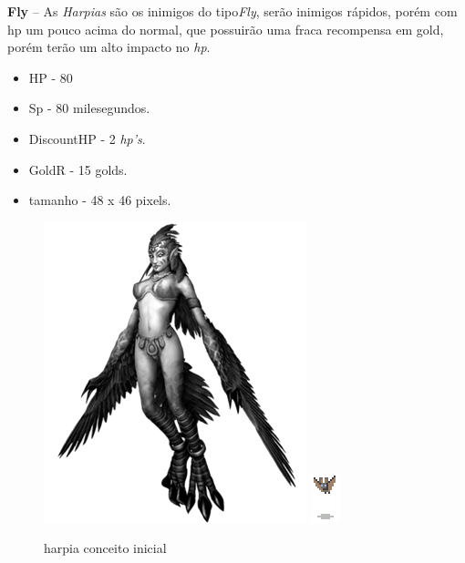 \documentclass[11pt]{article} %
\begin{document}
\newpage

\textbf{{\large Fly}} – As \textit{Harpias} são os inimigos do tipo\textit{Fly}, serão inimigos rápidos, porém com hp um pouco acima do normal, que possuirão uma fraca recompensa em gold, porém terão um alto impacto no \textit{hp}.

\begin{itemize}
\item HP - 80
\item Sp - 80 milesegundos.
\item DiscountHP - 2 \textit{hp's}.
\item GoldR - 15 golds.
\item tamanho - 48 x 46 pixels.
\end{itemize}

\begin{figure}[!htp]
\centering
\includegraphics[scale=0.75]{res/characters/harpia.png} \quad
\includegraphics[scale=2]{res/characters/bat.png} 
\caption{harpia conceito inicial}
\label{harpia}
\end{figure}
\end{document}
